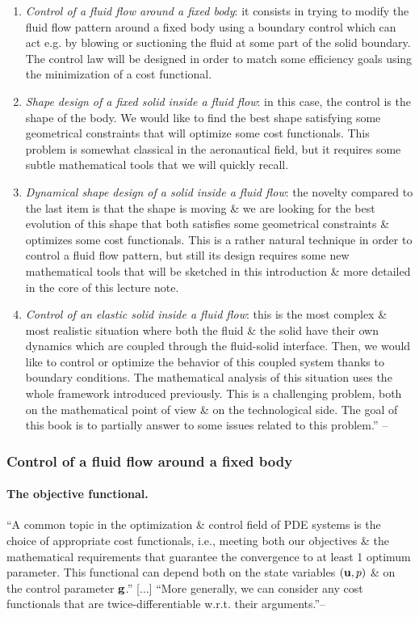 \documentclass[oneside]{book}
\numberwithin{equation}{section}
\begin{document}
\begin{enumerate}
	\item \textit{Control of a fluid flow around a fixed body}: it consists in trying to modify the fluid flow pattern around a fixed body using a boundary control which can act e.g. by blowing or suctioning the fluid at some part of the solid boundary. The control law will be designed in order to match some efficiency goals using the minimization of a cost functional.
	\item \textit{Shape design of a fixed solid inside a fluid flow}: in this case, the control is the shape of the body. We would like to find the best shape satisfying some geometrical constraints that will optimize some cost functionals. This problem is somewhat classical in the aeronautical field, but it requires some subtle mathematical tools that we will quickly recall.
	\item \textit{Dynamical shape design of a solid inside a fluid flow}: the novelty compared to the last item is that the shape is moving \& we are looking for the best evolution of this shape that both satisfies some geometrical constraints \& optimizes some cost functionals. This is a rather natural technique in order to control a fluid flow pattern, but still its design requires some new mathematical tools that will be sketched in this introduction \& more detailed in the core of this lecture note.
	\item \textit{Control of an elastic solid inside a fluid flow}: this is the most complex \& most realistic situation where both the fluid \& the solid have their own dynamics which are coupled through the fluid-solid interface. Then, we would like to control or optimize the behavior of this coupled system thanks to boundary conditions. The mathematical analysis of this situation uses the whole framework introduced previously. This is a challenging problem, both on the mathematical point of view \& on the technological side. The goal of this book is to partially answer to some issues related to this problem.'' -- \cite[Chap. 1, Sect. 1.4, pp. 7--8]{Moubachir_Zolesio2006}
\end{enumerate}

\subsubsection{Control of a fluid flow around a fixed body}

\paragraph{The objective functional.} ``A common topic in the optimization \& control field of PDE systems is the choice of appropriate cost functionals, i.e., meeting both our objectives \& the mathematical requirements that guarantee the convergence to at least 1 optimum parameter. This functional can depend both on the state variables $({\bf u},p)$ \& on the control parameter ${\bf g}$.'' [$\ldots$] ``More generally, we can consider any cost functionals that are twice-differentiable w.r.t. their arguments.''-- \cite[Chap. 1, Subsect. 1.4.1, pp. 9--10]{Moubachir_Zolesio2006}
\end{document}
